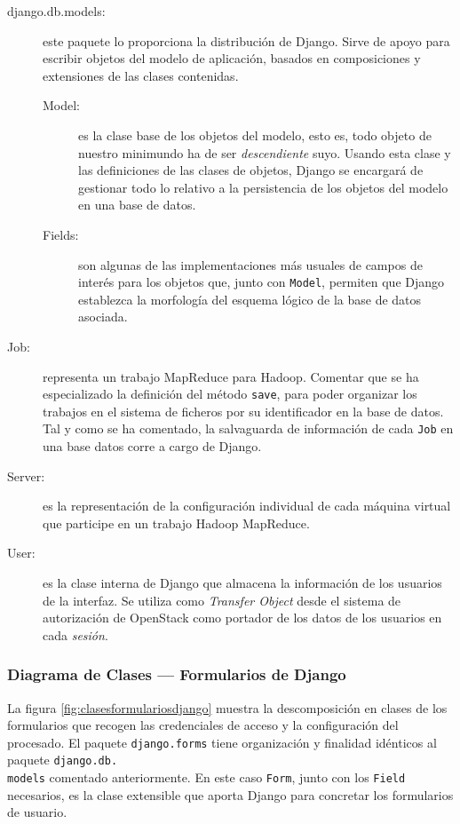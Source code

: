 \begin{description}
 \item[django.db.models:] este paquete lo proporciona la distribuci\'on de Django. Sirve de apoyo para escribir objetos del modelo de aplicaci\'on, basados en composiciones y extensiones de las clases contenidas.
  \begin{description}
   \item[Model:] es la clase base de los objetos del modelo, esto es, todo objeto de nuestro minimundo ha de ser \emph{descendiente} suyo. Usando esta clase y las definiciones de las clases de objetos, Django se encargar\'a de gestionar todo lo relativo a la persistencia de los objetos del modelo en una base de datos.
   \item[Fields:] son algunas de las implementaciones m\'as usuales de campos de inter\'es para los objetos que, junto con \texttt{Model}, permiten que Django establezca la morfolog\'ia del esquema l\'ogico de la base de datos asociada.
  \end{description}
 \item[Job:] representa un trabajo MapReduce para Hadoop. Comentar que se ha especializado la definici\'on del m\'etodo \texttt{save}, para poder organizar los trabajos en el sistema de ficheros por su identificador en la base de datos. Tal y como se ha comentado, la salvaguarda de informaci\'on de cada \texttt{Job} en una base datos corre a cargo de Django.
 \item[Server:] es la representaci\'on de la configuraci\'on individual de cada m\'aquina virtual que participe en un trabajo Hadoop MapReduce.
 \item[User:] es la clase interna de Django que almacena la informaci\'on de los usuarios de la interfaz. Se utiliza como \emph{Transfer Object} desde el sistema de autorizaci\'on de OpenStack como portador de los datos de los usuarios en cada \emph{sesi\'on}.
\end{description}


\subsubsection{Diagrama de Clases --- Formularios de Django}\label{subsubsec:clasesformulariosdjango}
\noindent La figura \ref{fig:clasesformulariosdjango} muestra la descomposici\'on en clases de los formularios que recogen las credenciales de acceso y la configuraci\'on del procesado. El paquete \texttt{django.forms} tiene organizaci\'on y finalidad id\'enticos al paquete \texttt{django.db.\\models} comentado anteriormente. En este caso \texttt{Form}, junto con los \texttt{Field} necesarios, es la clase extensible que aporta Django para concretar los formularios de usuario.

